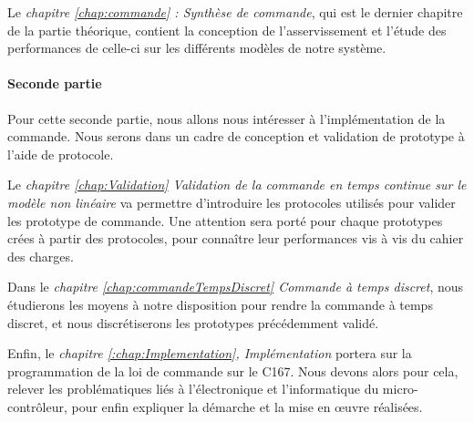 Le \emph{chapitre \ref{chap:commande} : Synthèse de commande}, qui est le dernier chapitre de la partie théorique, contient la conception de l'asservissement et l'étude des performances de celle-ci sur les différents modèles de notre système.

\paragraph*{Seconde partie}
Pour cette seconde partie, nous allons nous intéresser à l'implémentation de la commande. Nous serons dans un cadre de conception et validation de prototype à l'aide de protocole.

Le \emph{chapitre \ref{chap:Validation} Validation de la commande en temps continue sur le modèle non linéaire} va permettre d'introduire les protocoles utilisés pour valider les prototype de commande. Une attention sera porté pour chaque prototypes crées à partir des protocoles, pour connaître leur performances vis à vis du cahier des charges.

Dans le \emph{chapitre \ref{chap:commandeTempsDiscret} Commande à temps discret}, nous étudierons les moyens à notre disposition pour rendre la commande à temps discret, et nous discrétiserons les prototypes précédemment validé.

Enfin, le \emph{chapitre \ref{:chap:Implementation}, Implémentation} portera sur la programmation de la loi de commande sur le C167. Nous devons alors pour cela, relever les problématiques liés à l’électronique et l'informatique du micro-contrôleur, pour enfin expliquer la démarche et la mise en œuvre réalisées.



